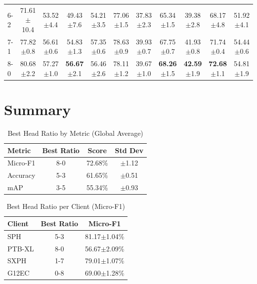 \documentclass[11pt]{article}
\begin{document}
\begin{table}[h!]
\begin{tabular}{l|cc|cc|cc|cc|cc}
6-2 & 71.61$\pm$10.4 & 53.52$\pm$4.4 & 49.43$\pm$7.6 & 54.21$\pm$3.5 & 77.06$\pm$1.5 & 37.83$\pm$2.3 & 65.34$\pm$1.5 & 39.38$\pm$2.8 & 68.17$\pm$4.8 & 51.92$\pm$4.1 \\
7-1 & 77.82$\pm$0.8 & 56.61$\pm$0.6 & 54.83$\pm$1.3 & 57.35$\pm$0.6 & 78.63$\pm$0.9 & 39.93$\pm$0.7 & 67.75$\pm$0.7 & 41.93$\pm$0.8 & 71.74$\pm$0.4 & 54.44$\pm$0.6 \\
\rowcolor{lightgray}
8-0 & 80.68$\pm$2.2 & 57.27$\pm$1.0 & \textbf{56.67}$\pm$2.1 & 56.46$\pm$2.6 & 78.11$\pm$1.2 & 39.67$\pm$1.0 & \textbf{68.26}$\pm$1.5 & \textbf{42.59}$\pm$1.9 & \textbf{72.68}$\pm$1.1 & 54.81$\pm$1.9 \\
\bottomrule
\end{tabular}
\end{table}

\section{Summary}

\begin{table}[h!]
\centering
\caption{Best Head Ratio by Metric (Global Average)}
\label{tab:summary_global}
\begin{tabular}{@{}lccc@{}}
\toprule
\textbf{Metric} & \textbf{Best Ratio} & \textbf{Score} & \textbf{Std Dev} \\
\midrule
Micro-F1 & 8-0 & 72.68\% & $\pm$1.12 \\
Accuracy & 5-3 & 61.65\% & $\pm$0.51 \\
mAP & 3-5 & 55.34\% & $\pm$0.93 \\
\bottomrule
\end{tabular}
\end{table}

\begin{table}[h!]
\centering
\caption{Best Head Ratio per Client (Micro-F1)}
\label{tab:summary_client}
\begin{tabular}{@{}lcc@{}}
\toprule
\textbf{Client} & \textbf{Best Ratio} & \textbf{Micro-F1} \\
\midrule
SPH & 5-3 & 81.17$\pm$1.04\% \\
PTB-XL & 8-0 & 56.67$\pm$2.09\% \\
SXPH & 1-7 & 79.01$\pm$1.07\% \\
G12EC & 0-8 & 69.00$\pm$1.28\% \\
\bottomrule
\end{tabular}
\end{table}
\end{document}
